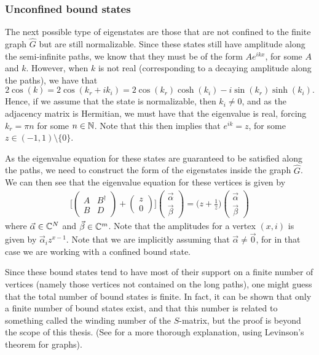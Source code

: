 \documentclass[../thesis-main/thesis-main]{subfiles}
\begin{document}
\subsubsection{Unconfined bound states}

The next possible type of eigenstates are those that are not confined to the finite graph $\widehat{G}$ but are still normalizable.  Since these states still have amplitude along the semi-infinite paths, we know that they must be of the form $Ae^{i k x}$, for some $A$ and $k$.  However, when $k$ is not real (corresponding to a decaying amplitude along the paths), we have that
\begin{equation}
  2 \cos(k) = 2\cos(k_r + i k_i) = 2 \cos(k_r) \cosh(k_i) - i \sin(k_r) \sinh(k_i).
\end{equation}
Hence, if we assume that the state is normalizable, then $k_i \neq 0$, and as the adjacency matrix is Hermitian, we must have that the eigenvalue is real, forcing $k_r = \pi n$ for some $n\in \mathbb{N}$.  Note that this then implies that $e^{i k} = z$, for some $z\in(-1,1)\setminus\{0\}$.

As the eigenvalue equation for these states are guaranteed to be satisfied along the paths, we need to construct the form of the eigenstates inside the graph $\widehat{G}$.  We can then see that the eigenvalue equation for these vertices is given by
\begin{align}
\bigg[
  \begin{pmatrix} 
    A & B^\dag\\
    B & D
  \end{pmatrix}
  + \begin{pmatrix} 
    z \\
    0
  \end{pmatrix}
  \bigg] \begin{pmatrix}
    \vec{\alpha}\\
    \vec{\beta}
  \end{pmatrix} = \Big(z + \frac{1}{z}\Big) \begin{pmatrix} 
    \vec{\alpha}\\
    \vec{\beta}
  \end{pmatrix}
\end{align}
where $\vec{\alpha} \in \mathbb{C}^N$ and $\vec{\beta}\in \mathbb{C}^m$.  Note that the amplitudes for a vertex $(x,i)$ is given by $\vec{\alpha}_i z^{x-1}$.  Note that we are implicitly assuming that $\vec{\alpha} \neq \vec{0}$, for in that case we are working with a confined bound state.  

Since these bound states tend to have most of their support on a finite number of vertices (namely those vertices not contained on the long paths), one might guess that the total number of bound states is finite.  In fact, it can be shown that only a finite number of bound states exist, and that this number is related to something called the winding number of the $S$-matrix, but the proof is beyond the scope of this thesis. (See \cite{CG12} for a more thorough explanation, using Levinson's theorem for graphs). 
\end{document}
